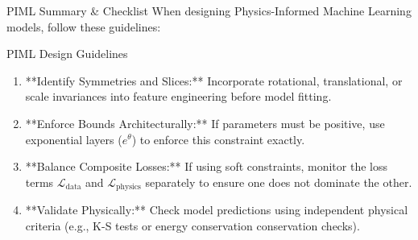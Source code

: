 \documentclass[9pt]{beamer}
\begin{document}
\begin{frame}{PIML Summary \& Checklist}
  When designing Physics-Informed Machine Learning models, follow these guidelines:
  \begin{block}{PIML Design Guidelines}
    \begin{enumerate}
      \item **Identify Symmetries and Slices:** Incorporate rotational, translational, or scale invariances into feature engineering before model fitting.
      \item **Enforce Bounds Architecturally:** If parameters must be positive, use exponential layers ($e^{\theta}$) to enforce this constraint exactly.
      \item **Balance Composite Losses:** If using soft constraints, monitor the loss terms $\mathcal{L}_{\text{data}}$ and $\mathcal{L}_{\text{physics}}$ separately to ensure one does not dominate the other.
      \item **Validate Physically:** Check model predictions using independent physical criteria (e.g., K-S tests or energy conservation conservation checks).
    \end{enumerate}
  \end{block}
\end{frame}
\end{document}
